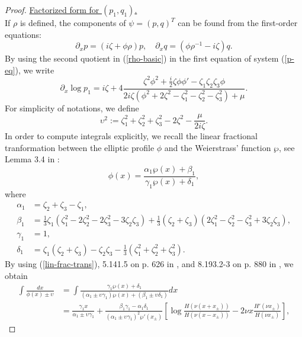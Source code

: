 \documentclass[12pt,reqno]{amsart}
\numberwithin{equation}{section}
\begin{document}
\begin{proof}
\underline{Factorized form for $(p_1,q_1)$.} \\
If $\rho$ is defined, the components of $\psi = (p,q)^T$ can be found from the first-order  equations:
\begin{equation}
\label{p-eq}
\partial_x p = (i \zeta + \phi \rho) p, \quad 
\partial_x q = (\phi \rho^{-1} - i \zeta) q.
\end{equation}
By using the second quotient in (\ref{rho-basic}) in the first equation of system (\ref{p-eq}), we write
\begin{equation}
\label{p-integrals}
\partial_x \log p_1 = i \zeta + 4 \frac{\zeta^2 \phi^2 + \frac{i}{2} \zeta \phi \phi' - \zeta_1 \zeta_2 \zeta_3 \phi}{2 i \zeta (\phi^2 + 2 \zeta^2 - \zeta_1^2 - \zeta_2^2 - \zeta_3^2) + \mu}.
\end{equation}
For simplicity of notations, we define
\begin{equation}
\label{upsilon}
\upsilon^2 := \zeta_1^2 + \zeta_2^2 + \zeta_3^2 - 2 \zeta^2 - \frac{\mu}{2i \zeta}.
\end{equation}
In order to compute integrals explicitly, we recall the linear fractional tranformation between the elliptic profile $\phi$ and the Weierstrass' function $\wp$, see Lemma 3.4 in \cite{AP25}:
\begin{equation}
\label{lin-frac-trans}
\phi(x) = \frac{\alpha_1 \wp(x) + \beta_1}{\gamma_1 \wp(x) + \delta_1},
\end{equation}
where 
\begin{align*}
\alpha_1 &= \zeta_2 + \zeta_3 - \zeta_1,\\
\beta_1 &= \frac{1}{3} \zeta_1 (\zeta_1^2 - 2 \zeta_2^2 - 2 \zeta_3^2 - 3 \zeta_2 \zeta_3) + \frac{1}{3} (\zeta_2 + \zeta_3) (2 \zeta_1^2 - \zeta_2^2 - \zeta_3^2 + 3 \zeta_2 \zeta_3), \\
\gamma_1 &= 1,\\
\delta_1 &= \zeta_1 (\zeta_2 + \zeta_3) - \zeta_2 \zeta_3 -\frac{1}{3} (\zeta_1^2 + \zeta_2^2 + \zeta_3^2).
\end{align*}
By using (\ref{lin-frac-trans}), 5.141.5 on p. 626 in \cite{GR}, 
and 8.193.2-3 on p. 880 in \cite{GR}, we obtain 
\begin{align*}
\int \frac{dx}{\phi(x) \pm \upsilon} &= \int \frac{\gamma_1 \wp(x) + \delta_1}{(
	\alpha_1 \pm \upsilon \gamma_1) \wp(x) + (\beta_1 \pm \upsilon \delta_1)} dx \\
&= \frac{\gamma_1 x}{\alpha_1 \pm \upsilon \gamma_1} + \frac{\beta_1 \gamma_1 - \alpha_1 \delta_1}{(\alpha_1 \pm \upsilon \gamma_1)^2 \wp'(x_{\pm})} \left[ \log \frac{H(\nu(x + x_{\pm}))}{H(\nu(x-x_{\pm}))} - 2 \nu x \frac{H'(\nu x_{\pm})}{H(\nu x_{\pm})} \right], 

\end{align*}
\end{proof}
\end{document}
